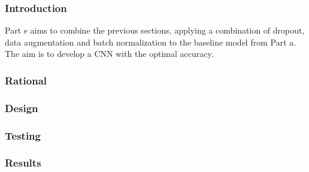 \subsubsection{Introduction}

Part e aims to combine the previous sections, applying a combination of dropout,
data augmentation and batch normalization to the baseline model from Part a.
The aim is to develop a CNN with the optimal accuracy.

\subsubsection{Rational}

\subsubsection{Design}

\subsubsection{Testing}

\subsubsection{Results}
